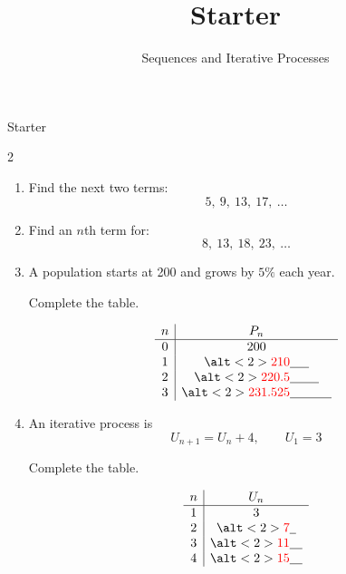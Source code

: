 \documentclass{beamer}
\title{Starter}
\subtitle{Sequences and Iterative Processes}
\newcommand{\ablank}[1]{%
  \alt<2>{\textcolor{red}{#1}}{\underline{\phantom{#1}}}%
}
\newcommand{\ashow}[1]{\uncover<2->{\textcolor{red}{\small #1}}}
\begin{document}
\begin{frame}{Starter}

\small

\begin{multicols}{2}

\begin{enumerate}

\item Find the next two terms:
\[
5,\ 9,\ 13,\ 17,\ \dots
\]

\ashow{$21,\ 25$}

\vspace{0.4cm}

\item Find an $n$th term for:
\[
8,\ 13,\ 18,\ 23,\ \dots
\]

\ashow{$5n+3$}

\vspace{0.4cm}

\item A population starts at 200 and grows by $5\%$ each year.

Complete the table.

\[
\begin{array}{c|c}
n & P_n \\
\hline
0 & 200 \\
1 & \ablank{210} \\
2 & \ablank{220.5} \\
3 & \ablank{231.525}
\end{array}
\]

\vspace{0.2cm}


\vspace{0.4cm}

\item An iterative process is
\[
U_{n+1} = U_n + 4, \qquad U_1 = 3
\]

Complete the table.

\[
\begin{array}{c|c}
n & U_n \\
\hline
1 & 3 \\
2 & \ablank{7} \\
3 & \ablank{11} \\
4 & \ablank{15}
\end{array}
\]

\end{enumerate}

\end{multicols}

\end{frame}
\end{document}

